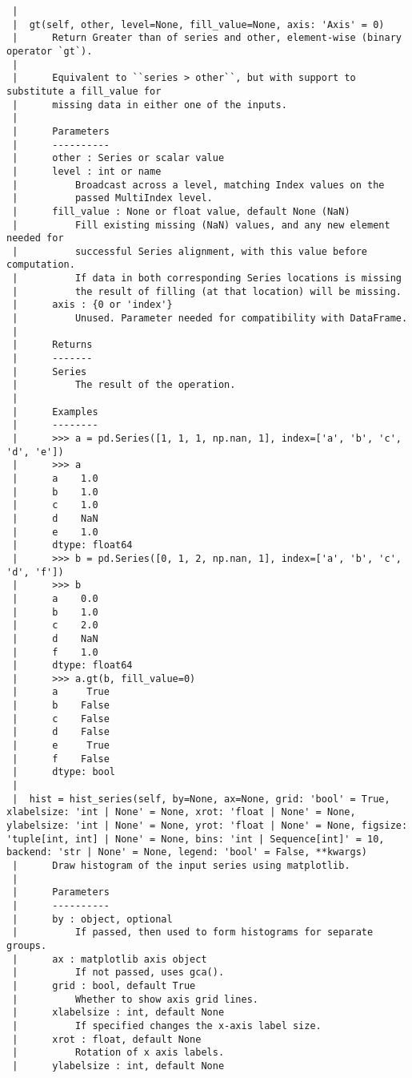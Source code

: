 \documentclass[
  letterpaper,
  DIV=11,
  numbers=noendperiod]{scrreprt}
\begin{document}
\begin{verbatim}
 |  
 |  gt(self, other, level=None, fill_value=None, axis: 'Axis' = 0)
 |      Return Greater than of series and other, element-wise (binary operator `gt`).
 |      
 |      Equivalent to ``series > other``, but with support to substitute a fill_value for
 |      missing data in either one of the inputs.
 |      
 |      Parameters
 |      ----------
 |      other : Series or scalar value
 |      level : int or name
 |          Broadcast across a level, matching Index values on the
 |          passed MultiIndex level.
 |      fill_value : None or float value, default None (NaN)
 |          Fill existing missing (NaN) values, and any new element needed for
 |          successful Series alignment, with this value before computation.
 |          If data in both corresponding Series locations is missing
 |          the result of filling (at that location) will be missing.
 |      axis : {0 or 'index'}
 |          Unused. Parameter needed for compatibility with DataFrame.
 |      
 |      Returns
 |      -------
 |      Series
 |          The result of the operation.
 |      
 |      Examples
 |      --------
 |      >>> a = pd.Series([1, 1, 1, np.nan, 1], index=['a', 'b', 'c', 'd', 'e'])
 |      >>> a
 |      a    1.0
 |      b    1.0
 |      c    1.0
 |      d    NaN
 |      e    1.0
 |      dtype: float64
 |      >>> b = pd.Series([0, 1, 2, np.nan, 1], index=['a', 'b', 'c', 'd', 'f'])
 |      >>> b
 |      a    0.0
 |      b    1.0
 |      c    2.0
 |      d    NaN
 |      f    1.0
 |      dtype: float64
 |      >>> a.gt(b, fill_value=0)
 |      a     True
 |      b    False
 |      c    False
 |      d    False
 |      e     True
 |      f    False
 |      dtype: bool
 |  
 |  hist = hist_series(self, by=None, ax=None, grid: 'bool' = True, xlabelsize: 'int | None' = None, xrot: 'float | None' = None, ylabelsize: 'int | None' = None, yrot: 'float | None' = None, figsize: 'tuple[int, int] | None' = None, bins: 'int | Sequence[int]' = 10, backend: 'str | None' = None, legend: 'bool' = False, **kwargs)
 |      Draw histogram of the input series using matplotlib.
 |      
 |      Parameters
 |      ----------
 |      by : object, optional
 |          If passed, then used to form histograms for separate groups.
 |      ax : matplotlib axis object
 |          If not passed, uses gca().
 |      grid : bool, default True
 |          Whether to show axis grid lines.
 |      xlabelsize : int, default None
 |          If specified changes the x-axis label size.
 |      xrot : float, default None
 |          Rotation of x axis labels.
 |      ylabelsize : int, default None

\end{verbatim}
\end{document}
